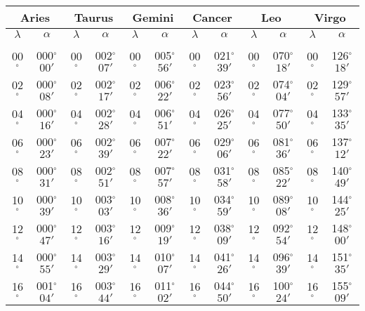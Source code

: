 \clearpage
\begin{table}
\centering
{\small \begin{tabular}{cc|cc|cc|cc|cc|cc}
\multicolumn{2}{c}{Aries}\vline & \multicolumn{2}{c}{Taurus} \vline& \multicolumn{2}{c}{Gemini} \vline& \multicolumn{2}{c}{Cancer}\vline &
\multicolumn{2}{c}{Leo}\vline & \multicolumn{2}{c}{Virgo}\\\hline
$\lambda$& $\alpha$& $\lambda$& $\alpha$& $\lambda$& $\alpha$& $\lambda$& $\alpha$& $\lambda$& $\alpha$& $\lambda$& $\alpha$\\\hline
&&&&&&&&&&&\\[-2ex]
00$^\circ$ & 000$^\circ$$00'$ & 00$^\circ$ & 002$^\circ$$07'$ & 00$^\circ$ & 005$^\circ$$56'$ & 00$^\circ$ & 021$^\circ$$39'$ & 00$^\circ$ & 070$^\circ$$18'$ & 00$^\circ$ & 126$^\circ$$18'$\\
02$^\circ$ & 000$^\circ$$08'$ & 02$^\circ$ & 002$^\circ$$17'$ & 02$^\circ$ & 006$^\circ$$22'$ & 02$^\circ$ & 023$^\circ$$56'$ & 02$^\circ$ & 074$^\circ$$04'$ & 02$^\circ$ & 129$^\circ$$57'$\\
04$^\circ$ & 000$^\circ$$16'$ & 04$^\circ$ & 002$^\circ$$28'$ & 04$^\circ$ & 006$^\circ$$51'$ & 04$^\circ$ & 026$^\circ$$25'$ & 04$^\circ$ & 077$^\circ$$50'$ & 04$^\circ$ & 133$^\circ$$35'$\\
06$^\circ$ & 000$^\circ$$23'$ & 06$^\circ$ & 002$^\circ$$39'$ & 06$^\circ$ & 007$^\circ$$22'$ & 06$^\circ$ & 029$^\circ$$06'$ & 06$^\circ$ & 081$^\circ$$36'$ & 06$^\circ$ & 137$^\circ$$12'$\\
08$^\circ$ & 000$^\circ$$31'$ & 08$^\circ$ & 002$^\circ$$51'$ & 08$^\circ$ & 007$^\circ$$57'$ & 08$^\circ$ & 031$^\circ$$58'$ & 08$^\circ$ & 085$^\circ$$22'$ & 08$^\circ$ & 140$^\circ$$49'$\\
10$^\circ$ & 000$^\circ$$39'$ & 10$^\circ$ & 003$^\circ$$03'$ & 10$^\circ$ & 008$^\circ$$36'$ & 10$^\circ$ & 034$^\circ$$59'$ & 10$^\circ$ & 089$^\circ$$08'$ & 10$^\circ$ & 144$^\circ$$25'$\\
12$^\circ$ & 000$^\circ$$47'$ & 12$^\circ$ & 003$^\circ$$16'$ & 12$^\circ$ & 009$^\circ$$19'$ & 12$^\circ$ & 038$^\circ$$09'$ & 12$^\circ$ & 092$^\circ$$54'$ & 12$^\circ$ & 148$^\circ$$00'$\\
14$^\circ$ & 000$^\circ$$55'$ & 14$^\circ$ & 003$^\circ$$29'$ & 14$^\circ$ & 010$^\circ$$07'$ & 14$^\circ$ & 041$^\circ$$26'$ & 14$^\circ$ & 096$^\circ$$39'$ & 14$^\circ$ & 151$^\circ$$35'$\\
16$^\circ$ & 001$^\circ$$04'$ & 16$^\circ$ & 003$^\circ$$44'$ & 16$^\circ$ & 011$^\circ$$02'$ & 16$^\circ$ & 044$^\circ$$50'$ & 16$^\circ$ & 100$^\circ$$24'$ & 16$^\circ$ & 155$^\circ$$09'$\\

\end{tabular}}
\end{table}
